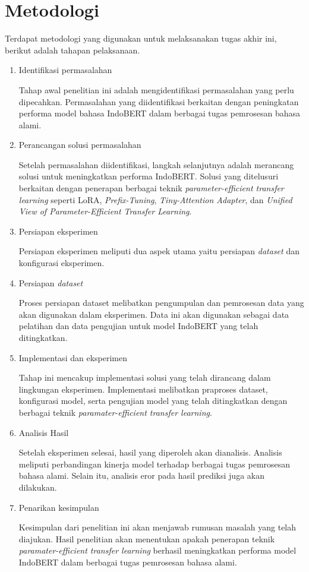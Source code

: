 \section{Metodologi}

Terdapat metodologi yang digunakan untuk melaksanakan tugas akhir ini, berikut adalah tahapan pelaksanaan.

\begin{enumerate}
    \item Identifikasi permasalahan
    
    Tahap awal penelitian ini adalah mengidentifikasi permasalahan yang perlu dipecahkan. Permasalahan yang diidentifikasi berkaitan dengan peningkatan performa model bahasa IndoBERT dalam berbagai tugas pemrosesan bahasa alami.

    \item Perancangan solusi permasalahan
    
    Setelah permasalahan diidentifikasi, langkah selanjutnya adalah merancang solusi untuk meningkatkan performa IndoBERT. Solusi yang ditelusuri berkaitan dengan penerapan berbagai teknik \textit{parameter-efficient transfer learning} seperti LoRA, \textit{Prefix-Tuning}, \textit{Tiny-Attention Adapter}, dan \textit{Unified View of Parameter-Efficient Transfer Learning}.

    \item Persiapan eksperimen
    
    Persiapan eksperimen meliputi dua aspek utama yaitu persiapan \textit{dataset} dan konfigurasi eksperimen.

    \item Persiapan \textit{dataset}
    
    Proses persiapan dataset melibatkan pengumpulan dan pemrosesan data yang akan digunakan dalam eksperimen. Data ini akan digunakan sebagai data pelatihan dan data pengujian untuk model IndoBERT yang telah ditingkatkan.

    \item Implementasi dan eksperimen
    
    Tahap ini mencakup implementasi solusi yang telah dirancang dalam lingkungan eksperimen. Implementasi melibatkan praproses dataset, konfigurasi model, serta pengujian model yang telah ditingkatkan dengan berbagai teknik \textit{paramater-efficient transfer learning}.

    \item Analisis Hasil
    
    Setelah eksperimen selesai, hasil yang diperoleh akan dianalisis. Analisis meliputi perbandingan kinerja model terhadap berbagai tugas pemrosesan bahasa alami. Selain itu, analisis eror pada hasil prediksi juga akan dilakukan.

    \item Penarikan kesimpulan
    
    Kesimpulan dari penelitian ini akan menjawab rumusan masalah yang telah diajukan. Hasil penelitian akan menentukan apakah penerapan teknik \textit{paramater-efficient transfer learning} berhasil meningkatkan performa model IndoBERT dalam berbagai tugas pemrosesan bahasa alami.

\end{enumerate}